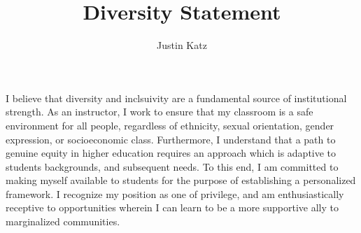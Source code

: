 \documentclass[12pt]{amsart}
\title{Diversity Statement}
\author{Justin Katz}
\date{} %
\begin{document}
\maketitle
I believe that diversity and inclsuivity are a fundamental source of institutional strength. As an instructor, I work to ensure that my classroom is a safe environment for all people, regardless of ethnicity, sexual orientation, gender expression, or socioeconomic class. Furthermore, I understand that a path to genuine equity in higher education requires an approach which is adaptive to students backgrounds, and subsequent needs. To this end, I am committed to making myself available to students for the purpose of establishing a personalized framework.  I recognize my position as one of privilege, and am enthusiastically receptive to opportunities wherein I can learn to be a more supportive ally to marginalized communities.  
\end{document}

